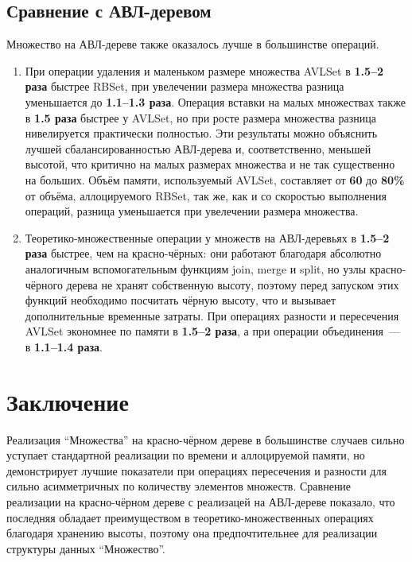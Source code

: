 \documentclass[a4paper]{article}
\begin{document}
\subsection{Сравнение с АВЛ-деревом}
Множество на АВЛ-дереве также оказалось лучше в большинстве операций.
\begin{enumerate}
    \item При операции удаления и маленьком размере множества AVLSet в \textbf{1.5--2 раза} быстрее RBSet, при увелечении размера множества 
    разница уменьшается до \textbf{1.1--1.3 раза}. Операция вставки на малых множествах также в \textbf{1.5 раза} быстрее у AVLSet, но при росте 
    размера множества разница нивелируется практически полностью. Эти результаты можно объяснить лучшей сбалансированностью АВЛ-дерева и, соответственно,
    меньшей высотой, что критично на малых размерах множества и не так существенно на больших.
    Объём памяти, используемый AVLSet, составляет от \textbf{60} до \textbf{80\%}  от объёма, аллоцируемого RBSet, так же, как и со
    скоростью выполнения операций, разница уменьшается при увелечении размера множества.
    \item Теоретико-множественные операции у множеств на АВЛ-деревьях в \textbf{1.5--2 раза} быстрее, чем на красно-чёрных: они работают благодаря абсолютно 
    аналогичным вспомогательным функциям join, merge и split, но узлы красно-чёрного дерева не хранят собственную высоту, поэтому перед запуском этих 
    функций необходимо посчитать чёрную высоту, что и вызывает дополнительные временные затраты.
    При операциях разности и пересечения AVLSet экономнее по памяти в \textbf{1.5--2 раза}, а при операции объединения~--- в \textbf{1.1--1.4 раза}.
\end{enumerate}

\section{Заключение}

Реализация \enquote{Множества} на красно-чёрном дереве в большинстве случаев сильно уступает стандартной реализации по времени и аллоцируемой памяти, 
но демонстрирует лучшие показатели при операциях пересечения и разности для сильно асимметричных по количеству элементов множеств.
Сравнение реализации на красно-чёрном дереве с реализацей на АВЛ-дереве показало, что последняя обладает преимуществом в теоретико-множественных операциях благодаря 
хранению высоты, поэтому она предпочтительнее для реализации структуры данных \enquote{Множество}. 
\end{document}
